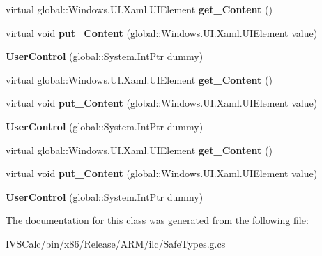 \begin{DoxyCompactItemize}
virtual global\+::\+Windows.\+U\+I.\+Xaml.\+U\+I\+Element {\bfseries get\+\_\+\+Content} ()
\item 
\mbox{\label{class_windows_1_1_u_i_1_1_xaml_1_1_controls_1_1_user_control_a5ec8d8927fff6f65232539dd290d7686}} 
virtual void {\bfseries put\+\_\+\+Content} (global\+::\+Windows.\+U\+I.\+Xaml.\+U\+I\+Element value)
\item 
\mbox{\label{class_windows_1_1_u_i_1_1_xaml_1_1_controls_1_1_user_control_a5b671a79ac14225d5319c77623284ace}} 
{\bfseries User\+Control} (global\+::\+System.\+Int\+Ptr dummy)
\item 
\mbox{\label{class_windows_1_1_u_i_1_1_xaml_1_1_controls_1_1_user_control_a53c73d0b641c4a441f1d32f8eadecaa4}} 
virtual global\+::\+Windows.\+U\+I.\+Xaml.\+U\+I\+Element {\bfseries get\+\_\+\+Content} ()
\item 
\mbox{\label{class_windows_1_1_u_i_1_1_xaml_1_1_controls_1_1_user_control_a5ec8d8927fff6f65232539dd290d7686}} 
virtual void {\bfseries put\+\_\+\+Content} (global\+::\+Windows.\+U\+I.\+Xaml.\+U\+I\+Element value)
\item 
\mbox{\label{class_windows_1_1_u_i_1_1_xaml_1_1_controls_1_1_user_control_a5b671a79ac14225d5319c77623284ace}} 
{\bfseries User\+Control} (global\+::\+System.\+Int\+Ptr dummy)
\item 
\mbox{\label{class_windows_1_1_u_i_1_1_xaml_1_1_controls_1_1_user_control_a53c73d0b641c4a441f1d32f8eadecaa4}} 
virtual global\+::\+Windows.\+U\+I.\+Xaml.\+U\+I\+Element {\bfseries get\+\_\+\+Content} ()
\item 
\mbox{\label{class_windows_1_1_u_i_1_1_xaml_1_1_controls_1_1_user_control_a5ec8d8927fff6f65232539dd290d7686}} 
virtual void {\bfseries put\+\_\+\+Content} (global\+::\+Windows.\+U\+I.\+Xaml.\+U\+I\+Element value)
\item 
\mbox{\label{class_windows_1_1_u_i_1_1_xaml_1_1_controls_1_1_user_control_a5b671a79ac14225d5319c77623284ace}} 
{\bfseries User\+Control} (global\+::\+System.\+Int\+Ptr dummy)
\end{DoxyCompactItemize}


The documentation for this class was generated from the following file\+:\begin{DoxyCompactItemize}
\item 
I\+V\+S\+Calc/bin/x86/\+Release/\+A\+R\+M/ilc/Safe\+Types.\+g.\+cs\end{DoxyCompactItemize}

